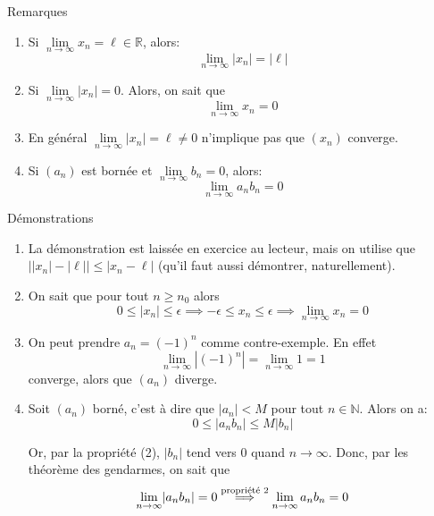 \documentclass[a4paper]{article}
\begin{document}
\begin{parag}{Remarques}
    \begin{enumerate}[left=0pt]
        \item Si $\lim\limits_{n \to \infty} x_n = \ell \in \mathbb{R}$, alors:
        \[\lim\limits_{n \to \infty} \left|x_n\right| = \left|\ell\right|\]
        
        \item Si $\lim\limits_{n \to \infty} \left|x_n\right| = 0$. Alors, on sait que 
        \[\lim\limits_{n \to \infty} x_n = 0\]
        
    \item En général $\lim\limits_{n \to \infty} \left|x_n\right| = \ell \neq 0$ n'implique pas que $\left(x_n\right)$ converge.
    \item Si $\left(a_n\right)$ est bornée et $\lim\limits_{n \to \infty} b_n = 0$, alors: 
    \[\lim_{n \to \infty} a_n b_n = 0\]
    
    \end{enumerate}
    
    \begin{subparag}{Démonstrations}
        \begin{enumerate}[left=0pt]
            \item La démonstration est laissée en exercice au lecteur, mais on utilise que $\left|\left|x_n\right| - \left|\ell\right|\right| \leq \left|x_n - \ell\right|$ (qu'il faut aussi démontrer, naturellement).
            \item On sait que pour tout $n \geq n_0$ alors 
        \[0 \leq \left|x_n\right| \leq \epsilon \implies -\epsilon \leq x_n \leq \epsilon \implies \lim_{n \to \infty} x_n = 0\]
    \item On peut prendre $a_n = \left(-1\right)^n$ comme contre-exemple. En effet 
        \[\lim_{n \to \infty} \left|\left(-1\right)^n\right| = \lim_{n \to \infty} 1 = 1\]
        converge, alors que $\left(a_n\right)$ diverge.
    \item Soit $\left(a_n\right)$ borné, c'est à dire que $\left|a_n\right| < M$ pour tout $n \in \mathbb{N}$. Alors on a: 
    \[0 \leq \left|a_n b_n\right| \leq M \left|b_n\right|\]
    
    Or, par la propriété (2), $\left|b_n\right|$ tend vers 0 quand $n \to \infty$. Donc, par les théorème des gendarmes, on sait que 
    \[\lim_{n \to \infty} \left|a_n b_n\right| = 0 \over{\implies}{\text{propriété 2}} \lim_{n \to \infty} a_n b_n = 0 \]
        \end{enumerate}
    \end{subparag}
\end{parag}
\end{document}
